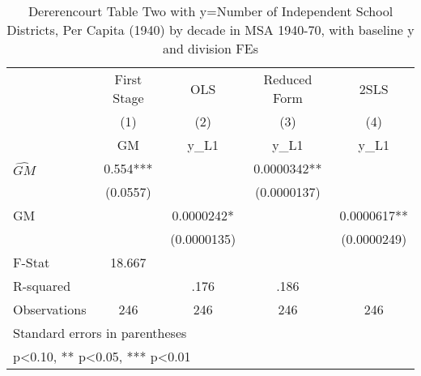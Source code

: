 \begin{table}[htbp]\centering
\def\sym#1{\ifmmode^{#1}\else\(^{#1}\)\fi}
\caption{Dererencourt Table Two with y=Number of Independent School Districts, Per Capita (1940) by decade in MSA 1940-70, with baseline y and division FEs}
\begin{tabular}{l*{4}{c}}
\toprule
                    & First Stage   &         OLS   &Reduced Form   &        2SLS   \\
                    &\multicolumn{1}{c}{(1)}&\multicolumn{1}{c}{(2)}&\multicolumn{1}{c}{(3)}&\multicolumn{1}{c}{(4)}\\
                    &\multicolumn{1}{c}{GM}&\multicolumn{1}{c}{y\_L1}&\multicolumn{1}{c}{y\_L1}&\multicolumn{1}{c}{y\_L1}\\
\midrule
$\hat{GM}$          &       0.554***&               &   0.0000342** &               \\
                    &    (0.0557)   &               & (0.0000137)   &               \\
\addlinespace
GM                  &               &   0.0000242*  &               &   0.0000617** \\
                    &               & (0.0000135)   &               & (0.0000249)   \\
\midrule
F-Stat              &      18.667   &               &               &               \\
R-squared           &               &        .176   &        .186   &               \\
Observations        &         246   &         246   &         246   &         246   \\
\bottomrule
\multicolumn{5}{l}{\footnotesize Standard errors in parentheses}\\
\multicolumn{5}{l}{\footnotesize * p<0.10, ** p<0.05, *** p<0.01}\\
\end{tabular}
\end{table}
